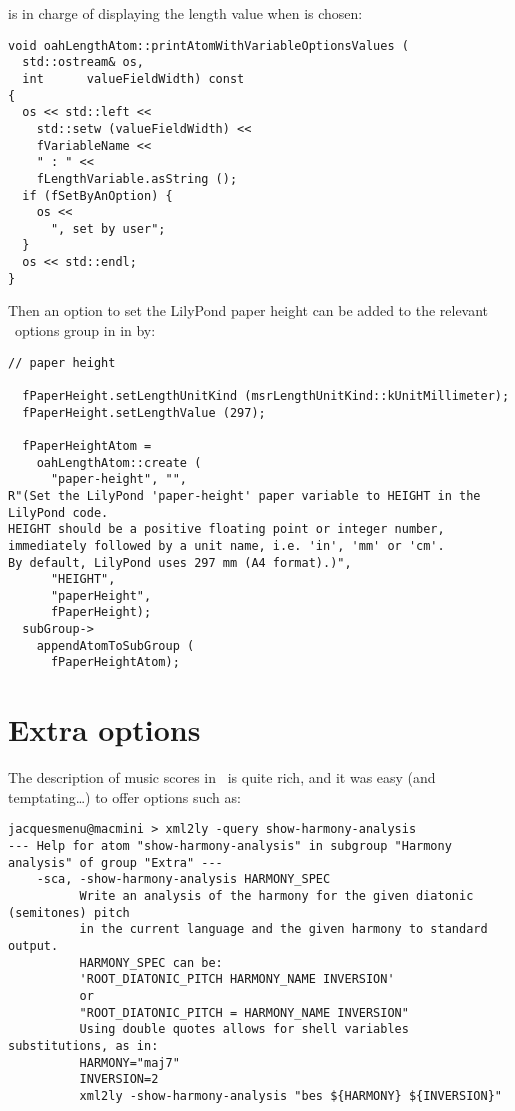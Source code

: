  is in charge of displaying the length value when  is chosen:
\begin{lstlisting}[language=CPlusPlus]
void oahLengthAtom::printAtomWithVariableOptionsValues (
  std::ostream& os,
  int      valueFieldWidth) const
{
  os << std::left <<
    std::setw (valueFieldWidth) <<
    fVariableName <<
    " : " <<
    fLengthVariable.asString ();
  if (fSetByAnOption) {
    os <<
      ", set by user";
  }
  os << std::endl;
}
\end{lstlisting}

Then an option to set the LilyPond paper height can be added to the relevant \oahRepr\ options group in  in  by:
\begin{lstlisting}[language=CPlusPlus]
  // paper height

  fPaperHeight.setLengthUnitKind (msrLengthUnitKind::kUnitMillimeter);
  fPaperHeight.setLengthValue (297);

  fPaperHeightAtom =
    oahLengthAtom::create (
      "paper-height", "",
R"(Set the LilyPond 'paper-height' paper variable to HEIGHT in the LilyPond code.
HEIGHT should be a positive floating point or integer number,
immediately followed by a unit name, i.e. 'in', 'mm' or 'cm'.
By default, LilyPond uses 297 mm (A4 format).)",
      "HEIGHT",
      "paperHeight",
      fPaperHeight);
  subGroup->
    appendAtomToSubGroup (
      fPaperHeightAtom);
\end{lstlisting}


\section{Extra options}

The description of music scores in \mf\ is quite rich, and it was easy (and temptating\dots) to offer options such as:
\begin{lstlisting}[language=Terminal]
jacquesmenu@macmini > xml2ly -query show-harmony-analysis
--- Help for atom "show-harmony-analysis" in subgroup "Harmony analysis" of group "Extra" ---
    -sca, -show-harmony-analysis HARMONY_SPEC
          Write an analysis of the harmony for the given diatonic (semitones) pitch
          in the current language and the given harmony to standard output.
          HARMONY_SPEC can be:
          'ROOT_DIATONIC_PITCH HARMONY_NAME INVERSION'
          or
          "ROOT_DIATONIC_PITCH = HARMONY_NAME INVERSION"
          Using double quotes allows for shell variables substitutions, as in:
          HARMONY="maj7"
          INVERSION=2
          xml2ly -show-harmony-analysis "bes ${HARMONY} ${INVERSION}"
\end{lstlisting}


